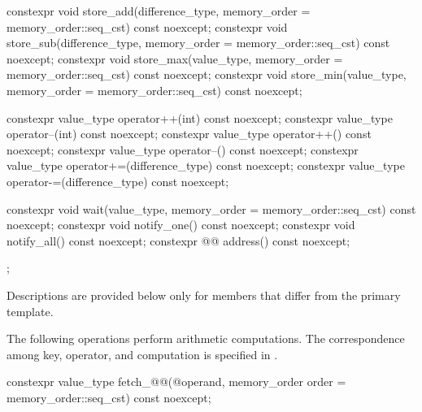 \begin{codeblock}
{{    constexpr void store_add(difference_type,
                             memory_order = memory_order::seq_cst) const noexcept;
    constexpr void store_sub(difference_type,
                             memory_order = memory_order::seq_cst) const noexcept;
    constexpr void store_max(value_type,
                             memory_order = memory_order::seq_cst) const noexcept;
    constexpr void store_min(value_type,
                             memory_order = memory_order::seq_cst) const noexcept;

    constexpr value_type operator++(int) const noexcept;
    constexpr value_type operator--(int) const noexcept;
    constexpr value_type operator++() const noexcept;
    constexpr value_type operator--() const noexcept;
    constexpr value_type operator+=(difference_type) const noexcept;
    constexpr value_type operator-=(difference_type) const noexcept;

    constexpr void wait(value_type, memory_order = memory_order::seq_cst) const noexcept;
    constexpr void notify_one() const noexcept;
    constexpr void notify_all() const noexcept;
    constexpr @@ address() const noexcept;
  };
}
\end{codeblock}

\pnum
Descriptions are provided below only for members
that differ from the primary template.

\pnum
The following operations perform arithmetic computations.
The correspondence among key, operator, and computation is specified
in .

%
%
%
%
\begin{itemdecl}
constexpr value_type fetch_@@(@\seeabovenc@ operand,
                               memory_order order = memory_order::seq_cst) const noexcept;
\end{itemdecl}

